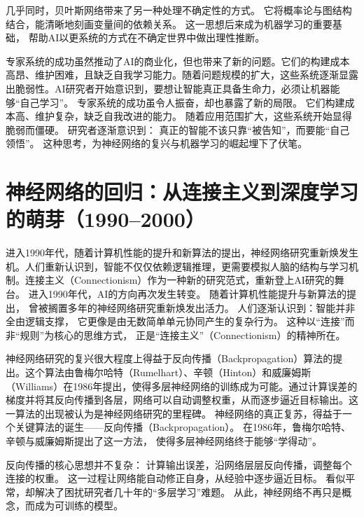 几乎同时，贝叶斯网络带来了另一种处理不确定性的方式。  
它将概率论与图结构结合，能清晰地刻画变量间的依赖关系。  
这一思想后来成为机器学习的重要基础，  
帮助AI以更系统的方式在不确定世界中做出理性推断。  

专家系统的成功虽然推动了AI的商业化，但也带来了新的问题。它们的构建成本高昂、维护困难，且缺乏自我学习能力。随着问题规模的扩大，这些系统逐渐显露出脆弱性。AI研究者开始意识到，要想让智能真正具备生命力，必须让机器能够“自己学习”。
专家系统的成功虽令人振奋，却也暴露了新的局限。  
它们构建成本高、维护复杂，缺乏自我改进的能力。  
随着应用范围扩大，这些系统开始显得脆弱而僵硬。  
研究者逐渐意识到：  
真正的智能不该只靠“被告知”，而要能“自己领悟”。  
这种思考，为神经网络的复兴与机器学习的崛起埋下了伏笔。  

\section{神经网络的回归：从连接主义到深度学习的萌芽（1990–2000）}

进入1990年代，随着计算机性能的提升和新算法的提出，神经网络研究重新焕发生机。人们重新认识到，智能不仅仅依赖逻辑推理，更需要模拟人脑的结构与学习机制。连接主义（Connectionism）作为一种新的研究范式，重新登上AI研究的舞台。
进入1990年代，AI的方向再次发生转变。  
随着计算机性能提升与新算法的提出，  
曾被搁置多年的神经网络研究重新焕发出活力。  
人们逐渐认识到：智能并非全由逻辑支撑，  
它更像是由无数简单单元协同产生的复杂行为。  
这种以“连接”而非“规则”为核心的思维方式，  
正是“连接主义”（Connectionism）的精神所在。  

神经网络研究的复兴很大程度上得益于反向传播（Backpropagation）算法的提出。这个算法由鲁梅尔哈特（Rumelhart）、辛顿（Hinton）和威廉姆斯（Williams）在1986年提出，使得多层神经网络的训练成为可能。通过计算误差的梯度并将其反向传播到各层，网络可以自动调整权重，从而逐步逼近目标输出。这一算法的出现被认为是神经网络研究的里程碑。
神经网络的真正复苏，得益于一个关键算法的诞生——反向传播（Backpropagation）。  
在1986年，鲁梅尔哈特、辛顿与威廉姆斯提出了这一方法，  
使得多层神经网络终于能够“学得动”。  

反向传播的核心思想并不复杂：  
计算输出误差，沿网络层层反向传播，调整每个连接的权重。  
这一过程让网络能自动修正自身，从经验中逐步逼近目标。  
看似平常，却解决了困扰研究者几十年的“多层学习”难题。  
从此，神经网络不再只是概念，而成为可训练的模型。  

